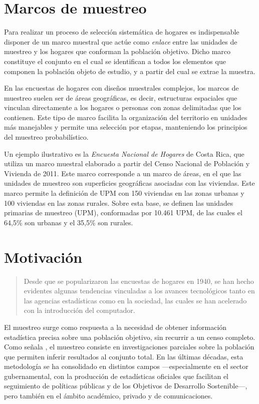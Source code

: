 \documentclass[
  spanish,
  12pt,
]{book}
\begin{document}
\section{Marcos de muestreo}\label{marcos-de-muestreo}

Para realizar un proceso de selección sistemática de hogares es indispensable disponer de un marco muestral que actúe como \emph{enlace} entre las unidades de muestreo y los hogares que conforman la población objetivo. Dicho marco constituye el conjunto en el cual se identifican a todos los elementos que componen la población objeto de estudio, y a partir del cual se extrae la muestra.

En las encuestas de hogares con diseños muestrales complejos, los marcos de muestreo suelen ser de áreas geográficas, es decir, estructuras espaciales que vinculan directamente a los hogares o personas con zonas delimitadas que los contienen. Este tipo de marco facilita la organización del territorio en unidades más manejables y permite una selección por etapas, manteniendo los principios del muestreo probabilístico.

Un ejemplo ilustrativo es la \emph{Encuesta Nacional de Hogares} de Costa Rica, que utiliza un marco muestral elaborado a partir del Censo Nacional de Población y Vivienda de 2011. Este marco corresponde a un marco de áreas, en el que las unidades de muestreo son superficies geográficas asociadas con las viviendas. Este marco permite la definición de UPM con 150 viviendas en las zonas urbanas y 100 viviendas en las zonas rurales. Sobre esta base, se definen las unidades primarias de muestreo (UPM), conformadas por 10.461 UPM, de las cuales el 64,5\% son urbanas y el 35,5\% son rurales.

\section{Motivación}\label{sec-motivacion}

\begin{quote}
Desde que se popularizaron las encuestas de hogares en 1940, se han hecho evidentes algunas tendencias vinculadas a los avances tecnológicos tanto en las agencias estadísticas como en la sociedad, las cuales se han acelerado con la introducción del computador.
\emph{\citet{gambino2009sampling}}
\end{quote}

El muestreo surge como respuesta a la necesidad de obtener información estadística precisa sobre una población objetivo, sin recurrir a un censo completo. Como señala \citet{Gutierrez2016}, el muestreo consiste en investigaciones parciales sobre la población que permiten inferir resultados al conjunto total. En las últimas décadas, esta metodología se ha consolidado en distintos campos ---especialmente en el sector gubernamental, con la producción de estadísticas oficiales que facilitan el seguimiento de políticas públicas y de los Objetivos de Desarrollo Sostenible---, pero también en el ámbito académico, privado y de comunicaciones.
\end{document}
